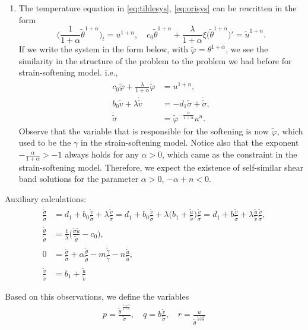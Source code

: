 \documentclass[a4paper,11pt]{article}
\def\tg{{\tilde{\gamma}}}
\def\tv{{\tilde{v}}}
\def\tth{{\tilde{\theta}}}
\def\ts{{\tilde{\sigma}}}
\def\tu{{\tilde{u}}}
\def\tph{{\tilde{\varphi}}}
\def\dtg{{\dot{\tilde{\gamma}}}}
\def\dtv{{\dot{\tilde{v}}}}
\def\dtth{{\dot{\tilde{\theta}}}}
\def\dts{{\dot{\tilde{\sigma}}}}
\def\dtu{{\dot{\tilde{u}}}}
\def\dtph{{\dot{\tilde{\varphi}}}}
\begin{document}
\begin{enumerate}
 \item The temperature equation in \eqref{eq:tildesys}, \eqref{eq:orisys} can be rewritten in the form
 $$ \Big(\frac{1}{1+\alpha} \tth^{1+\alpha}\Big)_t = u^{1+n}, \quad c_0\tth^{1+\alpha} + \frac{\lambda}{1+\alpha} \xi\big({\tth^{1+\alpha}}\big)' = \tu^{1+n}. $$
 If we write the system in the form below, with $\tph = \theta^{1+\alpha}$, we see the similarity in the structure of the problem to the problem we had before for strain-softening model. i.e.,
 \begin{align*}
  c_0\tph + \frac{ \lambda }{1+\alpha} \dtph &= u^{1+n},\\
  b_0\tv + \lambda \dtv &= -d_1\ts + \dts,\\
  \dts &= \tph^{-\frac{\alpha}{1+\alpha}} u^n.
 \end{align*}
 Observe that the variable that is responsible for the softening is now $\tph$, which used to be the $\gamma$ in the strain-softening model. Notice also that the exponent $-\frac{\alpha}{1+\alpha} >-1$ always holds for any $\alpha > 0$, which came as the constraint in the strain-softening model. Therefore, we expect the existence of self-similar shear band solutions for the parameter $\alpha>0$, $-\alpha+n<0$.
\end{enumerate}

Auxiliary calculations:
\begin{align*}
 \frac{\dts}{\ts} &= d_1+ b_0\frac{\tv}{\ts} + \lambda \frac{\dtv}{\ts} = d_1+ b_0\frac{\tv}{\ts} + \lambda \Big(b_1 + \frac{\tu}{\tv}\Big)\frac{\tv}{\ts} = d_1 + b\frac{\tv}{\ts} + \lambda\frac{\tu}{\tv}\frac{\tv}{\ts} ,\\
 \frac{\dtth}{\tth}&=\frac{1}{\lambda }\Big(\frac{\ts\tu}{\tth}-c_0\Big),\\
 0&=\frac{\dts}{\ts} +\alpha \frac{\dtth}{\tth} - m \frac{\dtg}{\tg} - n\frac{\dtu}{\tu},\\
 \frac{\dtv}{\tv}&= b_1 +\frac{\tu}{\tv}
\end{align*}

Based on this observations, we define the variables
\begin{equation}\label{eq:pqrsdef}
 \begin{aligned}
  p = \frac{\tth^{\,\frac{1+\alpha}{1+n}}}{\ts}, \quad q=b \frac{\tv}{\ts},  \quad r = \frac{u}{\tth^{\,\frac{1+\alpha}{1+n}}}
 \end{aligned}
\end{equation} 
\end{document}
